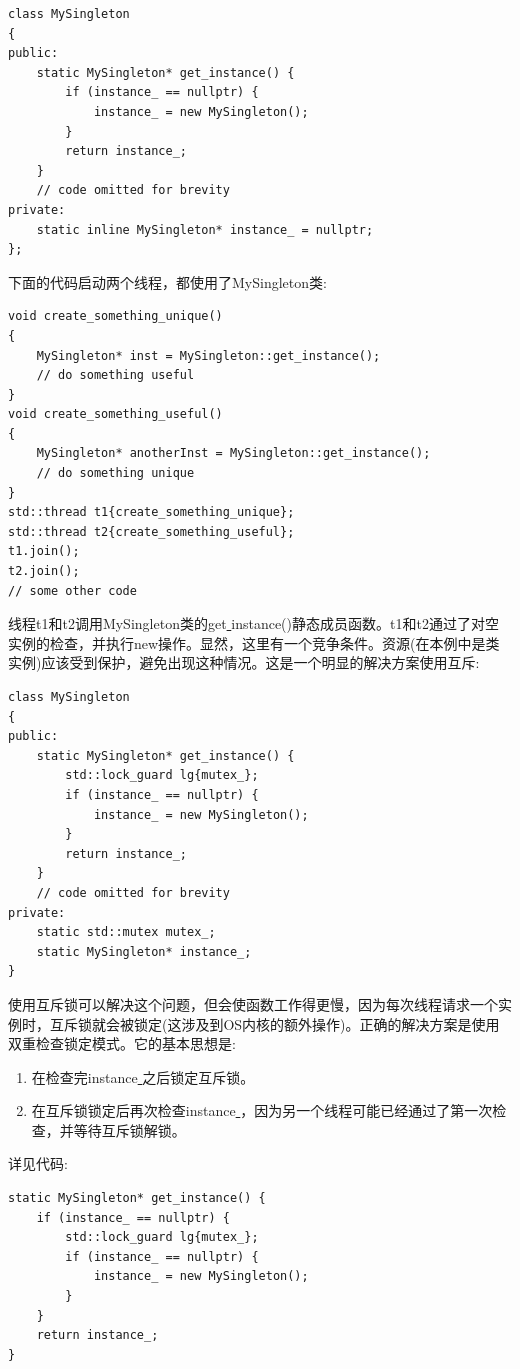 \begin{lstlisting}[caption={}]
class MySingleton
{
public:
	static MySingleton* get_instance() {
		if (instance_ == nullptr) {
			instance_ = new MySingleton();
		}
		return instance_;
	}
	// code omitted for brevity
private:
	static inline MySingleton* instance_ = nullptr;
};
\end{lstlisting}

下面的代码启动两个线程，都使用了MySingleton类: \par

\begin{lstlisting}[caption={}]
void create_something_unique()
{
	MySingleton* inst = MySingleton::get_instance();
	// do something useful
}
void create_something_useful()
{
	MySingleton* anotherInst = MySingleton::get_instance();
	// do something unique
}
std::thread t1{create_something_unique};
std::thread t2{create_something_useful};
t1.join();
t2.join();
// some other code
\end{lstlisting}

线程t1和t2调用MySingleton类的get\underline{ }instance()静态成员函数。t1和t2通过了对空实例的检查，并执行new操作。显然，这里有一个竞争条件。资源(在本例中是类实例)应该受到保护，避免出现这种情况。这是一个明显的解决方案使用互斥: \par

\begin{lstlisting}[caption={}]
class MySingleton
{
public:
	static MySingleton* get_instance() {
		std::lock_guard lg{mutex_};
		if (instance_ == nullptr) {
			instance_ = new MySingleton();
		}
		return instance_;
	}
	// code omitted for brevity
private:
	static std::mutex mutex_;
	static MySingleton* instance_;
}
\end{lstlisting}

使用互斥锁可以解决这个问题，但会使函数工作得更慢，因为每次线程请求一个实例时，互斥锁就会被锁定(这涉及到OS内核的额外操作)。正确的解决方案是使用双重检查锁定模式。它的基本思想是: \par

\begin{enumerate}
	\item 在检查完instance\underline{ }之后锁定互斥锁。
	\item 在互斥锁锁定后再次检查instance\underline{ }，因为另一个线程可能已经通过了第一次检查，并等待互斥锁解锁。
\end{enumerate}

详见代码: \par

\begin{lstlisting}[caption={}]
static MySingleton* get_instance() {
	if (instance_ == nullptr) {
		std::lock_guard lg{mutex_};
		if (instance_ == nullptr) {
			instance_ = new MySingleton();
		}
	}
	return instance_;
}
\end{lstlisting}


